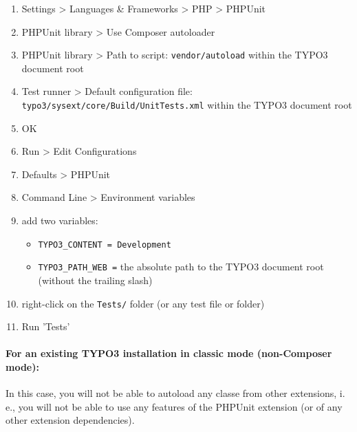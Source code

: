 \documentclass[a4paper,11pt,headsepline]{scrartcl}
\begin{document}
\begin{enumerate}
  \item Settings > Languages \& Frameworks > PHP > PHPUnit
  \item PHPUnit library > Use Composer autoloader
  \item PHPUnit library > Path to script: \texttt{vendor/autoload} within the TYPO3 document root
  \item Test runner > Default configuration file: \texttt{typo3/sysext/core/Build/UnitTests.xml} within the TYPO3 document root
  \item OK
  \item Run > Edit Configurations
  \item Defaults > PHPUnit
  \item Command Line > Environment variables
  \item add two variables:
    \begin{itemize}
      \item \texttt{TYPO3\_CONTENT = Development}
      \item \texttt{TYPO3\_PATH\_WEB =} the absolute path to the TYPO3 document root (without the trailing slash)
    \end{itemize}
  \item right-click on the \texttt{Tests/} folder (or any test file or folder)
  \item Run 'Tests'
\end{enumerate}


\paragraph{For an existing TYPO3 installation in classic mode (non-Composer mode):}

In this case, you will not be able to autoload any classe from other extensions, i.\,e., you will not be able to use any features of the PHPUnit extension (or of any other extension dependencies).
\end{document}
